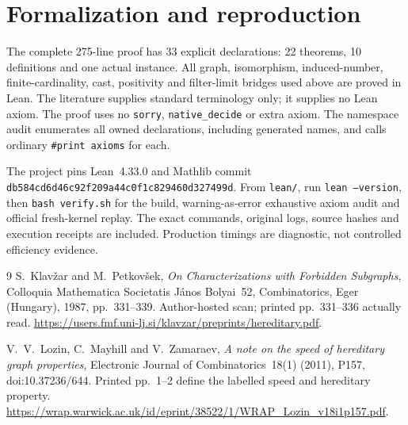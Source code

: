 \documentclass[11pt,a4paper]{article}
\begin{document}
\section*{Formalization and reproduction}
The complete 275-line proof has 33 explicit declarations: 22 theorems,
10 definitions and one actual instance. All graph, isomorphism, induced-number,
finite-cardinality, cast, positivity and filter-limit bridges used above are
proved in Lean. The literature supplies standard terminology only; it supplies
no Lean axiom. The proof uses no \texttt{sorry}, \texttt{native\_decide} or extra axiom.
The namespace audit enumerates all owned declarations, including generated names,
and calls ordinary \texttt{\#print axioms} for each.

The project pins Lean~4.33.0 and Mathlib commit
\texttt{db584cd6d46c92f209a44c0f1c829460d327499d}.
From \texttt{lean/}, run \texttt{lean --version}, then \texttt{bash verify.sh}
for the build, warning-as-error exhaustive axiom audit and official fresh-kernel
replay. The exact commands, original logs, source hashes and execution receipts
are included. Production timings are diagnostic, not controlled efficiency evidence.

\begin{thebibliography}{9}
S.~Klav\v{z}ar and M.~Petkov\v{s}ek,
\emph{On Characterizations with Forbidden Subgraphs},
Colloquia Mathematica Societatis J\'anos Bolyai~52,
Combinatorics, Eger (Hungary), 1987, pp.~331--339.
Author-hosted scan; printed pp.~331--336 actually read.
\url{https://users.fmf.uni-lj.si/klavzar/preprints/hereditary.pdf}.

V.~V.~Lozin, C.~Mayhill and V.~Zamaraev,
\emph{A note on the speed of hereditary graph properties},
Electronic Journal of Combinatorics~18(1) (2011), P157,
doi:10.37236/644. Printed pp.~1--2 define the labelled speed and hereditary property.
\url{https://wrap.warwick.ac.uk/id/eprint/38522/1/WRAP_Lozin_v18i1p157.pdf}.
\end{thebibliography}
\end{document}

